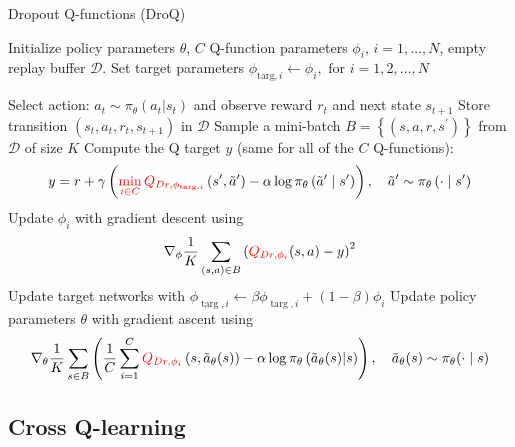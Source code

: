 \begin{algorithm}[H]
\caption{Dropout Q-functions (DroQ)}
\begin{algorithmic}[1]
\State Initialize policy parameters $\theta$, $C$ Q-function parameters $\phi_{i}$, $i=1,\ldots,N$, empty replay buffer $\mathcal{D}$. Set target parameters $\phi_{\text {targ}, i} \leftarrow \phi_{i}, \text{ for } i =1, 2, \ldots, N$

\Repeat
    \State Select action: $a_{t} \sim \pi_{\theta}(a_{t} | s_{t})$ and observe reward $r_{t}$ and next state $s_{t+1}$
    \State Store transition $(s_{t}, a_{t}, r_{t}, s_{t+1})$ in $\mathcal{D}$
        \State Sample a mini-batch $B=\left\{\left(s, a, r, s^{\prime} \right)\right\}$ from $\mathcal{D}$ of size $K$
        \State Compute the Q target $y$ (same for all of the $C$ Q-functions):
        \[
        y=r+\gamma\left(\textcolor{red}{\min _{i\in C} Q_{Dr, \phi_{\text {targ},i}}}\left(s^{\prime}, \tilde{a}^{\prime}\right)-\alpha \log \pi_{\theta}\left(\tilde{a}^{\prime} \mid s^{\prime}\right)\right),\quad \tilde{a}^{\prime} \sim \pi_{\theta}\left(\cdot \mid s^{\prime}\right)
        \]
            \State Update $\phi_i$ with gradient descent using
            \[
            \nabla_{\phi} \frac{1}{K} \sum_{\left(s, a \right) \in B}\left(\textcolor{red}{Q_{Dr, \phi_{i}}}(s, a)-y\right)^{2} 
            \]
            \State Update target networks with $\phi_{\operatorname{targ},i} \leftarrow \beta \phi_{\operatorname{targ},i}+(1-\beta) \phi_{i}$
        \EndFor
    \EndFor
    \State Update policy parameters $\theta$ with gradient ascent using
    \[
    \nabla_{\theta} \frac{1}{K} \sum_{s \in B}\left(\frac{1}{C}\sum_{i =1}^{C} \textcolor{red}{Q_{Dr,\phi_{i}}}\left(s, \tilde{a}_{\theta}(s)\right)-\alpha \log \pi_{\theta}\left(\tilde{a}_{\theta}(s) | s\right)\right),
    \quad \tilde{a}_{\theta}(s) \sim \pi_{\theta}(\cdot \mid s)
    \]
\end{algorithmic}
\end{algorithm}


\subsection{Cross Q-learning}\label{subsec:CROSSQ}


